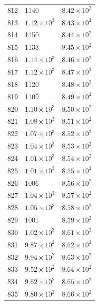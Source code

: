 \begin{table}[H]
\begin{tabular}{lll}
812 & 1140 & $\displaystyle 8.42 \times 10^{2}$ \\
813 & $\displaystyle 1.12 \times 10^{3}$ & $\displaystyle 8.43 \times 10^{2}$ \\
814 & 1150 & $\displaystyle 8.44 \times 10^{2}$ \\
815 & 1133 & $\displaystyle 8.45 \times 10^{2}$ \\
816 & $\displaystyle 1.14 \times 10^{3}$ & $\displaystyle 8.46 \times 10^{2}$ \\
817 & $\displaystyle 1.12 \times 10^{3}$ & $\displaystyle 8.47 \times 10^{2}$ \\
818 & 1120 & $\displaystyle 8.48 \times 10^{2}$ \\
819 & 1109 & $\displaystyle 8.49 \times 10^{2}$ \\
820 & $\displaystyle 1.10 \times 10^{3}$ & $\displaystyle 8.50 \times 10^{2}$ \\
821 & $\displaystyle 1.08 \times 10^{3}$ & $\displaystyle 8.51 \times 10^{2}$ \\
822 & $\displaystyle 1.07 \times 10^{3}$ & $\displaystyle 8.52 \times 10^{2}$ \\
823 & $\displaystyle 1.04 \times 10^{3}$ & $\displaystyle 8.53 \times 10^{2}$ \\
824 & $\displaystyle 1.01 \times 10^{3}$ & $\displaystyle 8.54 \times 10^{2}$ \\
825 & $\displaystyle 1.01 \times 10^{3}$ & $\displaystyle 8.55 \times 10^{2}$ \\
826 & 1006 & $\displaystyle 8.56 \times 10^{2}$ \\
827 & $\displaystyle 1.04 \times 10^{3}$ & $\displaystyle 8.57 \times 10^{2}$ \\
828 & $\displaystyle 1.05 \times 10^{3}$ & $\displaystyle 8.58 \times 10^{2}$ \\
829 & 1001 & $\displaystyle 8.59 \times 10^{2}$ \\
830 & $\displaystyle 1.02 \times 10^{3}$ & $\displaystyle 8.61 \times 10^{2}$ \\
831 & $\displaystyle 9.87 \times 10^{2}$ & $\displaystyle 8.62 \times 10^{2}$ \\
832 & $\displaystyle 9.94 \times 10^{2}$ & $\displaystyle 8.63 \times 10^{2}$ \\
833 & $\displaystyle 9.52 \times 10^{2}$ & $\displaystyle 8.64 \times 10^{2}$ \\
834 & $\displaystyle 9.62 \times 10^{2}$ & $\displaystyle 8.65 \times 10^{2}$ \\
835 & $\displaystyle 9.80 \times 10^{2}$ & $\displaystyle 8.66 \times 10^{2}$ \\

\end{tabular}
\end{table}
